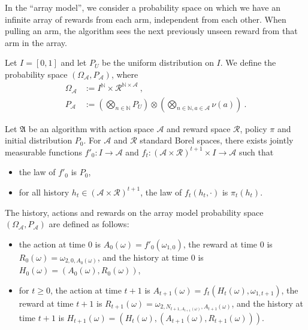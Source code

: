 In the ``array model'', we consider a probability space on which we have an infinite array of rewards from each arm, independent from each other.
When pulling an arm, the algorithm sees the next previously unseen reward from that arm in the array.

\begin{definition}\label{def:arrayMeasure}
  \leanok
Let $I = [0,1]$ and let $P_U$ be the uniform distribution on $I$. We define the probability space $(\Omega_{\mathcal{A}}, P_{\mathcal{A}})$, where
\begin{align*}
  \Omega_{\mathcal{A}} &:= I^{\mathbb{N}} \times \mathcal{R}^{\mathbb{N} \times \mathcal{A}}
  \: , \\
  P_{\mathcal{A}} &:= \left( \bigotimes_{n \in \mathbb{N}} P_U \right) \otimes \left( \bigotimes_{n \in \mathbb{N}, a \in \mathcal{A}} \nu(a) \right)
  \: .
\end{align*}
\end{definition}


\begin{definition}\label{def:algFunction}
  \leanok
Let $\mathfrak{A}$ be an algorithm with action space $\mathcal{A}$ and reward space $\mathcal{R}$, policy $\pi$ and initial distribution $P_0$.
For $\mathcal{A}$ and $\mathcal{R}$ standard Borel spaces, there exists jointly measurable functions $f'_0 : I \to \mathcal{A}$ and $f_t : (\mathcal{A} \times \mathcal{R})^{t+1} \times I \to \mathcal{A}$ such that
\begin{itemize}
  \item the law of $f'_0$ is $P_0$,
  \item for all history $h_t \in (\mathcal{A} \times \mathcal{R})^{t+1}$, the law of $f_t(h_t, \cdot)$ is $\pi_t(h_t)$.
\end{itemize}
\end{definition}


\begin{definition}\label{def:AM.history}
  \leanok
The history, actions and rewards on the array model probability space $(\Omega_{\mathcal{A}}, P_{\mathcal{A}})$ are defined as follows:
\begin{itemize}
  \item the action at time $0$ is $A_0(\omega) = f'_0(\omega_{1,0})$, the reward at time $0$ is $R_0(\omega) = \omega_{2,0,A_0(\omega)}$, and the history at time $0$ is $H_0(\omega) = (A_0(\omega), R_0(\omega))$,
  \item for $t \ge 0$, the action at time $t+1$ is $A_{t+1}(\omega) = f_t(H_t(\omega), \omega_{1,t+1})$, the reward at time $t+1$ is $R_{t+1}(\omega) = \omega_{2,N_{t+1,A_{t+1}(\omega)},A_{t+1}(\omega)}$, and the history at time $t+1$ is $H_{t+1}(\omega) = (H_t(\omega), (A_{t+1}(\omega), R_{t+1}(\omega)))$.
\end{itemize}
\end{definition}


